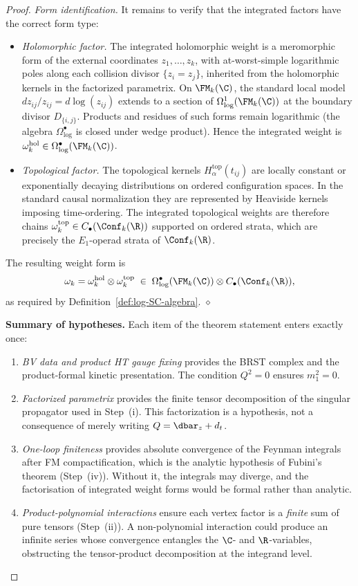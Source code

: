 \begin{proof}
\emph{Form identification.} It remains to verify that the integrated factors have the correct form type:
\begin{itemize}
\item \emph{Holomorphic factor.} The integrated holomorphic weight is a meromorphic form of the external coordinates $z_1, \ldots, z_k$, with at-worst-simple logarithmic poles along each collision divisor $\{z_i = z_j\}$, inherited from the holomorphic kernels in the factorized parametrix. On $\FM_k(\C)$, the standard local model $dz_{ij}/z_{ij} = d\log(z_{ij})$ extends to a section of $\Omega^1_{\log}(\FM_k(\C))$ at the boundary divisor $D_{\{i,j\}}$. Products and residues of such forms remain logarithmic (the algebra $\Omega^\bullet_{\log}$ is closed under wedge product). Hence the integrated weight is $\omega_k^{\mathrm{hol}} \in \Omega^\bullet_{\log}(\FM_k(\C))$.

\item \emph{Topological factor.} The topological kernels
$H_{\alpha}^{\mathrm{top}}(t_{ij})$ are locally constant or
exponentially decaying distributions on ordered configuration
spaces. In the standard causal normalization they are represented by
Heaviside kernels imposing time-ordering. The integrated topological
weights are therefore chains
$\omega_k^{\mathrm{top}} \in C_\bullet(\Conf_k(\R))$ supported on
ordered strata, which are precisely the $E_1$-operad strata of
$\Conf_k(\R)$.
\end{itemize}
The resulting weight form is
\[
 \omega_k = \omega_k^{\mathrm{hol}} \otimes \omega_k^{\mathrm{top}}
 \;\in\;
 \Omega^\bullet_{\log}(\FM_k(\C)) \otimes C_\bullet(\Conf_k(\R)),
\]
as required by Definition~\ref{def:log-SC-algebra}. \hfill$\diamond$

\medskip
\noindent\textbf{Summary of hypotheses.}
Each item of the theorem statement enters exactly once:
\begin{enumerate}[label=(\alph*)]
\item \emph{BV data and product HT gauge fixing} provides the
BRST complex and the product-formal kinetic presentation. The
condition $Q^2=0$ ensures $m_1^2=0$.
\item \emph{Factorized parametrix} provides the finite tensor
decomposition of the singular propagator used in Step~(i). This
factorization is a hypothesis, not a consequence of merely writing
$Q=\dbar_z+d_t$.
\item \emph{One-loop finiteness} provides absolute convergence of
the Feynman integrals after FM compactification, which is the
analytic hypothesis of Fubini's theorem (Step~(iv)). Without it, the
integrals may diverge, and the factorisation of integrated weight
forms would be formal rather than analytic.
\item \emph{Product-polynomial interactions} ensure each vertex
factor is a \emph{finite} sum of pure tensors (Step~(ii)). A
non-polynomial interaction could produce an infinite series whose
convergence entangles the $\C$- and $\R$-variables, obstructing the
tensor-product decomposition at the integrand level.
\end{enumerate}


\end{proof}
